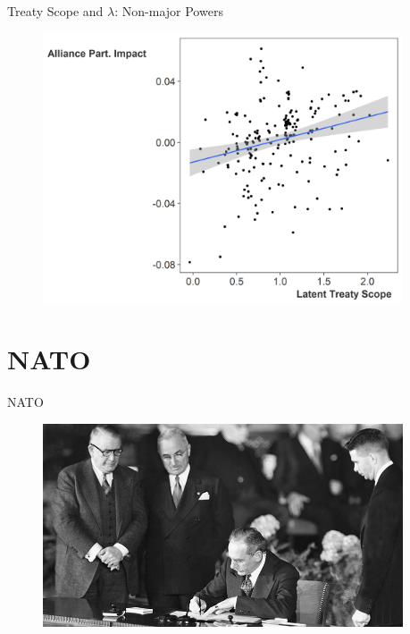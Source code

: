 \documentclass{beamer}
\begin{document}
\begin{frame}{Treaty Scope and $\lambda$: Non-major Powers}

\begin{figure}
	\centering
		\includegraphics[width=0.95\textwidth]{ls-lambda-min.png}
	\label{fig:ls-lambda-min}
\end{figure}


\end{frame}


\section{NATO}


\begin{frame}{NATO}

\begin{figure}
	\centering
		\includegraphics[width=0.95\textwidth]{acheson-nato-sign.jpg}
	\label{fig:acheson-nato-sign}
\end{figure}


\end{frame}
\end{document}
